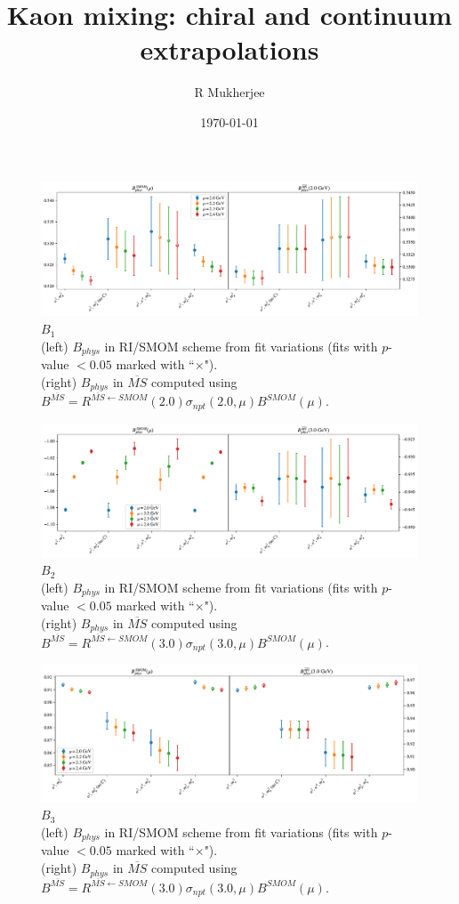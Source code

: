 \documentclass[12pt]{extarticle}
\title{Kaon mixing: chiral and continuum extrapolations}
\author{R Mukherjee}
\date{\today}
\begin{document}
\maketitle
\tableofcontents
\clearpage
\begin{figure}
\centering
\includegraphics[page=1, width=1.1\textwidth]{VVpAA/NPR/fit_summary.pdf}
\caption{$B_{1}$\\(left) $B_{phys}$ in RI/SMOM scheme from fit variations (fits with $p$-value $<0.05$ marked with ``$\times$"). \\(right) $B_{phys}$ in $\overline{MS}$ computed using $B^{\overline{MS}} = R^{\overline{MS}\leftarrow SMOM}(2.0)\sigma_{npt}(2.0,\mu) B^{SMOM}(\mu)$.}
\end{figure}
\clearpage
\begin{figure}
\centering
\includegraphics[page=1, width=1.1\textwidth]{VVmAA/NPR/fit_summary.pdf}
\caption{$B_{2}$\\(left) $B_{phys}$ in RI/SMOM scheme from fit variations (fits with $p$-value $<0.05$ marked with ``$\times$"). \\(right) $B_{phys}$ in $\overline{MS}$ computed using $B^{\overline{MS}} = R^{\overline{MS}\leftarrow SMOM}(3.0)\sigma_{npt}(3.0,\mu) B^{SMOM}(\mu)$.}
\end{figure}
\clearpage
\begin{figure}
\centering
\includegraphics[page=1, width=1.1\textwidth]{SSmPP/NPR/fit_summary.pdf}
\caption{$B_{3}$\\(left) $B_{phys}$ in RI/SMOM scheme from fit variations (fits with $p$-value $<0.05$ marked with ``$\times$"). \\(right) $B_{phys}$ in $\overline{MS}$ computed using $B^{\overline{MS}} = R^{\overline{MS}\leftarrow SMOM}(3.0)\sigma_{npt}(3.0,\mu) B^{SMOM}(\mu)$.}
\end{figure}
\end{document}
